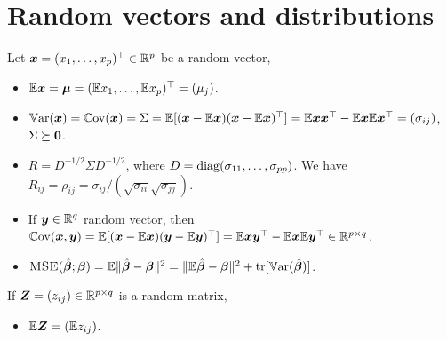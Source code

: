 \documentclass[10pt,a4paper]{book}
\begin{document}
\section{Random vectors and distributions}\label{sec:random_vector}
\begin{defbox}{}
	\begin{definition}\label{def:random_vector_moments}
		Let $\x=(x_1,\ldots, x_p)^\TT\in\bbR^p$ be a random vector, 
		\begin{itemize}
			\item {} $\bbE \x = \bam=(\bbE x_1,\ldots,\bbE x_p)^\TT=(\mu_j)$.
			\item {} $\Var(\x)=\Cov(\x)=\Sigma=\bbE[(\x-\bbE\x)(\x-\bbE\x)^\TT]=\bbE \x\x^\TT - \bbE \x \bbE \x^\TT = (\sigma_{ij})$, $\Sigma\succeq \0$.
			\item {} $R=D^{-1/2}\Sigma D^{-1/2}$, where $D=\diag(\sigma_{11},\ldots,\sigma_{pp})$. We have $R_{ij}=\rho_{ij}=\sigma_{ij}/(\sqrt{\sigma_{ii}}\sqrt{\sigma_{jj}})$.
			\item If $\y\in\bbR^{q}$ random vector, then $\Cov(\x,\y)=\bbE[(\x-\bbE\x)(\y-\bbE\y)^\TT]=\bbE\x\y^\TT-\bbE\x\bbE\y^\TT\in\bbR^{p\times q}$.  
			\item {} $\MSE(\hat{\bab};\bab)=\bbE \littlenorm{\hat{\bab}-\bab}^2=\littlenorm{\bbE\hat{\bab}-\bab}^2+\tr[\Var(\hat{\bab})]$. 
		\end{itemize} 
		If $\Z=(z_{ij})\in\bbR^{p\times q}$ is a random matrix,
		\begin{itemize}
			\item $\bbE\Z=(\bbE z_{ij})$. 
		\end{itemize} 
	\end{definition}
\end{defbox}
\end{document}
